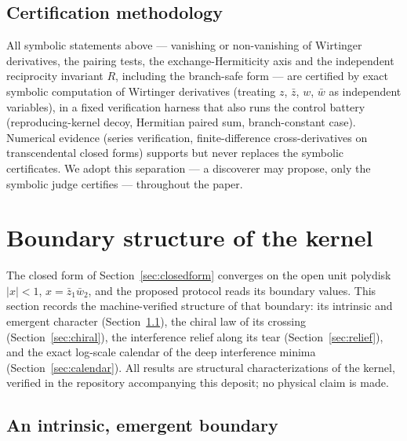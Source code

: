 \documentclass[11pt,a4paper]{article}
\newcommand{\zb}{\bar{z}}
\newcommand{\wb}{\bar{w}}
\newcommand{\zbone}{\bar{z}_1}
\newcommand{\wbtwo}{\bar{w}_2}
\begin{document}
\subsection{Certification methodology}

All symbolic statements above --- vanishing or non-vanishing of Wirtinger
derivatives, the pairing tests, the exchange-Hermiticity axis and the
independent reciprocity invariant $R$, including the branch-safe form --- are certified by exact symbolic computation of
Wirtinger derivatives (treating $z$, $\zb$, $w$, $\wb$ as independent
variables), in a fixed verification harness that also runs the control battery
(reproducing-kernel decoy, Hermitian paired sum, branch-constant case).
Numerical evidence (series verification, finite-difference cross-derivatives on
transcendental closed forms) supports but never replaces the symbolic
certificates. We adopt this separation --- a discoverer may propose, only the
symbolic judge certifies --- throughout the paper.

\section{Boundary structure of the kernel}
\label{sec:boundary}

The closed form of Section~\ref{sec:closedform} converges on the open unit
polydisk $|x| < 1$, $x = \zbone\wbtwo$, and the proposed protocol reads its
boundary values. This section records the machine-verified structure of that
boundary: its intrinsic and emergent character
(Section~\ref{sec:wall}), the chiral law of its crossing
(Section~\ref{sec:chiral}), the interference relief along its tear
(Section~\ref{sec:relief}), and the exact log-scale calendar of the deep
interference minima (Section~\ref{sec:calendar}). All results are
structural characterizations of the kernel, verified in the repository
accompanying this deposit; no physical claim is made.

\subsection{An intrinsic, emergent boundary}
\label{sec:wall}
\end{document}
